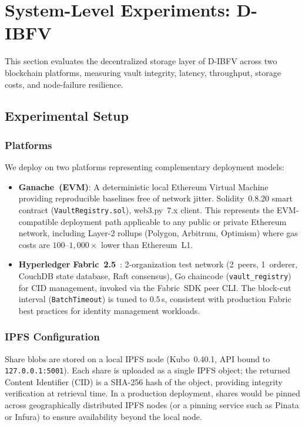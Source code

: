 \documentclass[3p,twocolumn]{elsarticle}
\newcommand{\DIBFV}{\textsf{D-IBFV}}
\begin{document}
\section{System-Level Experiments: \DIBFV{}}
\label{sec:system_experiments}

This section evaluates the decentralized storage layer of \DIBFV{} across two blockchain platforms, measuring vault integrity, latency, throughput, storage costs, and node-failure resilience.

\subsection{Experimental Setup}
\label{sec:sys_setup}

\subsubsection{Platforms}
We deploy on two platforms representing complementary deployment models:
\begin{itemize}
    \item \textbf{Ganache~(EVM)}: A deterministic local Ethereum Virtual Machine providing reproducible baselines free of network jitter. Solidity~0.8.20 smart contract (\texttt{VaultRegistry.sol}), web3.py~7.x client. This represents the EVM-compatible deployment path applicable to any public or private Ethereum network, including Layer-2 rollups (Polygon, Arbitrum, Optimism) where gas costs are $100$--$1{,}000\times$ lower than Ethereum~L1.
    \item \textbf{Hyperledger Fabric~2.5}~\cite{androulaki2018hyperledger}: 2-organization test network (2~peers, 1~orderer, CouchDB state database, Raft consensus), Go chaincode (\texttt{vault\_registry}) for CID management, invoked via the Fabric~SDK peer CLI. The block-cut interval (\texttt{BatchTimeout}) is tuned to $0.5$\,s, consistent with production Fabric best practices for identity management workloads.
\end{itemize}

\subsubsection{IPFS Configuration}
Share blobs are stored on a local IPFS node (Kubo~0.40.1, API bound to \texttt{127.0.0.1:5001}). Each share is uploaded as a single IPFS object; the returned Content Identifier (CID) is a SHA-256 hash of the object, providing integrity verification at retrieval time. In a production deployment, shares would be pinned across geographically distributed IPFS nodes (or a pinning service such as Pinata or Infura) to ensure availability beyond the local node.
\end{document}
